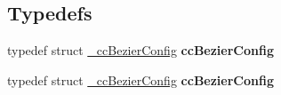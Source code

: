 \subsection*{Typedefs}
\begin{DoxyCompactItemize}
\item 
\mbox{\label{group__actions_ga9c93c7fa39d04995f6c0cc7c1d99c2a1}} 
typedef struct \hyperlink{struct__ccBezierConfig}{\+\_\+cc\+Bezier\+Config} {\bfseries cc\+Bezier\+Config}
\item 
\mbox{\label{group__actions_ga9c93c7fa39d04995f6c0cc7c1d99c2a1}} 
typedef struct \hyperlink{struct__ccBezierConfig}{\+\_\+cc\+Bezier\+Config} {\bfseries cc\+Bezier\+Config}
\end{DoxyCompactItemize}
